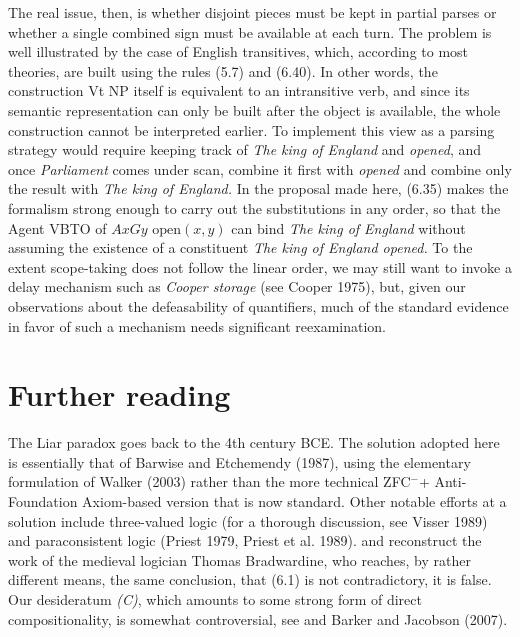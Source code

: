 The real issue, then, is whether disjoint pieces must be kept in partial
parses or whether a single combined sign must be available at each turn.  The
problem is well illustrated by the case of English transitives, which,
according to most theories, are built using the rules (5.7) and (6.40). In
other words, the construction Vt NP itself is equivalent to an intransitive
verb, and since its semantic representation can only be built after the object
is available, the whole construction cannot be interpreted earlier.  To
implement this view as a parsing strategy would require keeping track of {\it
  The king of England} and {\it opened}, and once {\it Parliament} comes
under scan, combine it first with {\it opened} and combine only the result
with {\it The king of England.} In the proposal made here, (6.35) makes the
formalism strong enough to carry out the substitutions in any order, so that
the Agent VBTO of $A x G y \text{ open}(x,y)$ can bind {\it The king of
  England} without assuming the existence of a constituent {\it The king of
  England opened.} To the extent scope-taking does not follow the linear order,
we may still want to invoke a delay mechanism such as {\it Cooper storage}
(see Cooper 1975), but, given our observations about the defeasability of
quantifiers, much of the standard evidence in favor of such a mechanism needs
significant reexamination.\nocite{Cooper:1975}

\section{Further reading}

The Liar paradox goes back to the 4th century BCE. The solution adopted here
is essentially that of Barwise and Etchemendy (1987), using the elementary
formulation of Walker (2003) rather than the more technical ZFC$^-$+
Anti-Foundation Axiom-based version \cite{Aczel:1988} that is now standard.
Other notable efforts at a solution include three-valued logic (for a thorough
discussion, see Visser 1989) and paraconsistent logic (Priest 1979, Priest et
al.  1989).  and  reconstruct the
work of the medieval logician Thomas Bradwardine, who reaches, by rather
different means, the same conclusion, that (6.1) is not contradictory, it is
false. Our desideratum {\sl (C)}, which amounts to some strong form of 
direct compositionality, is somewhat controversial, see 
and Barker and Jacobson (2007).\nocite{Barker:2007}

